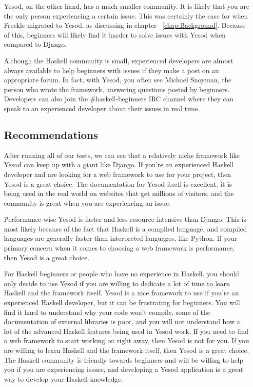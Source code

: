 Yesod, on the other hand, has a much smaller community. It is likely that
you are the only person experiencing a certain issue. This
was certainly the case for when Freckle migrated to Yesod, as discussing in
chapter ~\ref{chap:Background}. Because of this, beginners will likely find it
harder to solve issues with Yesod when compared to Django.

Although the Haskell community is small, experienced developers are almost always
available to help beginners with issues if they make a post on an appropriate
forum. In fact, with Yesod, you often see Michael Snoyman, the person who wrote
the framework, answering questions posted by beginners. Developers can also
join the \#haskell-beginners IRC channel where they can speak to an experienced
developer about their issues in real time.

\subsection{Recommendations}

After running all of our tests, we can see that a relatively niche framework
like Yesod can keep up with a giant like Django. If you're an experienced
Haskell developer and are looking for a web framework to use for your project,
then Yesod is a great choice. The documentation for Yesod itself is excellent,
it is being used in the real world on websites that get millions of visitors,
and the community is great when you are experiencing an issue.

Performance-wise Yesod is faster and less resource intensive than Django. This
is most likely because of the fact that Haskell is a compiled language, and
compiled languages are generally faster than interpreted languages, like Python.
If your primary concern when it comes to choosing a web framework is performance,
then Yesod is a great choice.

For Haskell beginners or people who have no experience in Haskell, you should
only decide to use Yesod if you are willing to dedicate a lot of time to learn
Haskell and the framework itself. Yesod is a nice framework to use if you're
an experienced Haskell developer, but it can be frustrating for beginners. You will
find it hard to understand why your code won't compile, some of the documentation
of external libraries is poor, and you will not understand how a lot of the
advanced Haskell features being used in Yesod work. If you need to find a web
framework to start working on right away, then Yesod is not for you. If you are
willing to learn Haskell and the framework itself, then Yesod is a great choice. 
The Haskell community is friendly towards
beginners and will be willing to help you if you are experiencing issues, and
developing a Yesod application is a great way to develop your Haskell knowledge.

